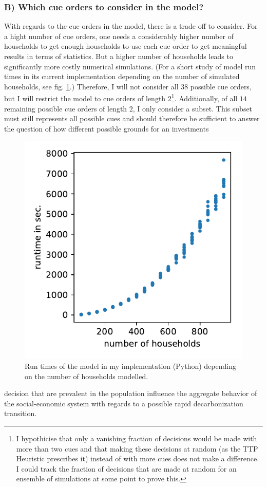 \subsubsection*{B) Which cue orders to consider in the model?}
With regards to the cue orders in the model, there is a trade off to consider. For a hight number of cue orders, one needs a considerably higher number of households to get enough households to use each cue order to get meaningful results in terms of statistics. But a higher number of households leads to significantly more costly numerical simulations. (For a short study of model run times in its current implementation depending on the number of simulated households, see fig. \ref{fig:runtime}.) Therefore, I will not consider all $38$ possible cue orders, but I will restrict the model to cue orders of length $2$\footnote{I hypothicise that only a vanishing fraction of decisions would be made with more than two cues and that making these decisions at random (as the TTP Heuristic prescribes it) instead of with more cues does not make a difference. I could track the fraction of decisions that are made at random for an ensemble of simulations at some point to prove this.}. Additionally, of all $14$ remaining possible cue orders of length $2$, I only consider a subset. This subset must still represents all possible cues and should therefore be sufficient to answer the question of how different possible grounds for an investments
\begin{figure}
	\vspace{-.4 cm}
        \hspace{-1.9 cm}
        \includegraphics[width = .55 \textwidth]{./figures/runtime.pdf}
        \caption{Run times of the model in my implementation (Python) depending on the number of households modelled.\label{fig:runtime}}
\end{figure}
decision that are prevalent in the population influence the aggregate behavior of the social-economic system with regards to a possible rapid decarbonization transition.\\

